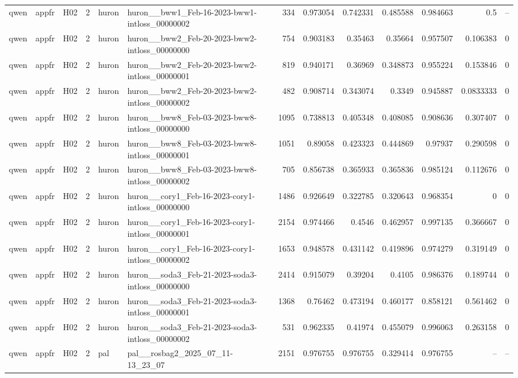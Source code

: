 \begin{longtable}{lllrllrrrrrrr}
qwen & appfr & H02 & 2 & huron & huron\_\_bww1\_Feb-16-2023-bww1-intloss\_00000002 & 334 & 0.973054 & 0.742331 & 0.485588 & 0.984663 & 0.5 & -- \\
qwen & appfr & H02 & 2 & huron & huron\_\_bww2\_Feb-20-2023-bww2-intloss\_00000000 & 754 & 0.903183 & 0.35463 & 0.35664 & 0.957507 & 0.106383 & 0 \\
qwen & appfr & H02 & 2 & huron & huron\_\_bww2\_Feb-20-2023-bww2-intloss\_00000001 & 819 & 0.940171 & 0.36969 & 0.348873 & 0.955224 & 0.153846 & 0 \\
qwen & appfr & H02 & 2 & huron & huron\_\_bww2\_Feb-20-2023-bww2-intloss\_00000002 & 482 & 0.908714 & 0.343074 & 0.3349 & 0.945887 & 0.0833333 & 0 \\
qwen & appfr & H02 & 2 & huron & huron\_\_bww8\_Feb-03-2023-bww8-intloss\_00000000 & 1095 & 0.738813 & 0.405348 & 0.408085 & 0.908636 & 0.307407 & 0 \\
qwen & appfr & H02 & 2 & huron & huron\_\_bww8\_Feb-03-2023-bww8-intloss\_00000001 & 1051 & 0.89058 & 0.423323 & 0.444869 & 0.97937 & 0.290598 & 0 \\
qwen & appfr & H02 & 2 & huron & huron\_\_bww8\_Feb-03-2023-bww8-intloss\_00000002 & 705 & 0.856738 & 0.365933 & 0.365836 & 0.985124 & 0.112676 & 0 \\
qwen & appfr & H02 & 2 & huron & huron\_\_cory1\_Feb-16-2023-cory1-intloss\_00000000 & 1486 & 0.926649 & 0.322785 & 0.320643 & 0.968354 & 0 & 0 \\
qwen & appfr & H02 & 2 & huron & huron\_\_cory1\_Feb-16-2023-cory1-intloss\_00000001 & 2154 & 0.974466 & 0.4546 & 0.462957 & 0.997135 & 0.366667 & 0 \\
qwen & appfr & H02 & 2 & huron & huron\_\_cory1\_Feb-16-2023-cory1-intloss\_00000002 & 1653 & 0.948578 & 0.431142 & 0.419896 & 0.974279 & 0.319149 & 0 \\
qwen & appfr & H02 & 2 & huron & huron\_\_soda3\_Feb-21-2023-soda3-intloss\_00000000 & 2414 & 0.915079 & 0.39204 & 0.4105 & 0.986376 & 0.189744 & 0 \\
qwen & appfr & H02 & 2 & huron & huron\_\_soda3\_Feb-21-2023-soda3-intloss\_00000001 & 1368 & 0.76462 & 0.473194 & 0.460177 & 0.858121 & 0.561462 & 0 \\
qwen & appfr & H02 & 2 & huron & huron\_\_soda3\_Feb-21-2023-soda3-intloss\_00000002 & 531 & 0.962335 & 0.41974 & 0.455079 & 0.996063 & 0.263158 & 0 \\
qwen & appfr & H02 & 2 & pal & pal\_\_rosbag2\_2025\_07\_11-13\_23\_07 & 2151 & 0.976755 & 0.976755 & 0.329414 & 0.976755 & -- & -- \\

\end{longtable}

